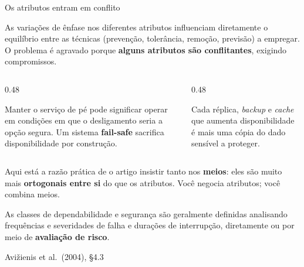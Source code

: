 \documentclass{beamer}
\newcommand{\sect}[1]{\par\smallskip\hfill{\tiny\color{black!55}Avi\v{z}ienis et al.\ (2004), #1}}
\begin{document}
\begin{frame}{Os atributos entram em conflito}
    \footnotesize
    \begin{defi}
        \scriptsize
        As varia\c{c}\~oes de \^enfase nos diferentes atributos influenciam diretamente o equil\'ibrio entre as t\'ecnicas (preven\c{c}\~ao, toler\^ancia, remo\c{c}\~ao, previs\~ao) a empregar. O problema \'e agravado porque \textbf{alguns atributos s\~ao conflitantes}, exigindo compromissos.
    \end{defi}
    \medskip
    \begin{columns}[T]
        \begin{column}{0.48\textwidth}
            \begin{tcolorbox}[colback=depLaranja!8,colframe=depLaranja!70,boxrule=0.6pt,title={\scriptsize\bfseries Disponibilidade x seguran\c{c}a f\'isica}]
                \scriptsize
                Manter o servi\c{c}o de p\'e pode significar operar em condi\c{c}\~oes em que o desligamento seria a op\c{c}\~ao segura. Um sistema \textbf{fail-safe} sacrifica disponibilidade por constru\c{c}\~ao.
            \end{tcolorbox}
        \end{column}
        \begin{column}{0.48\textwidth}
            \begin{tcolorbox}[colback=depLaranja!8,colframe=depLaranja!70,boxrule=0.6pt,title={\scriptsize\bfseries Disponibilidade x confidencialidade}]
                \scriptsize
                Cada r\'eplica, \textit{backup} e \textit{cache} que aumenta disponibilidade \'e mais uma c\'opia do dado sens\'ivel a proteger.
            \end{tcolorbox}
        \end{column}
    \end{columns}
    \medskip
    \begin{ancora}
        \footnotesize
        Aqui est\'a a raz\~ao pr\'atica de o artigo insistir tanto nos \textbf{meios}: eles s\~ao muito mais \textbf{ortogonais entre si} do que os atributos. Voc\^e negocia atributos; voc\^e combina meios.
    \end{ancora}
    \medskip
    {\scriptsize As classes de dependabilidade e seguran\c{c}a s\~ao geralmente definidas analisando frequ\^encias e severidades de falha e dura\c{c}\~oes de interrup\c{c}\~ao, diretamente ou por meio de \textbf{avalia\c{c}\~ao de risco}.}
    \sect{\S4.3}
\end{frame}
\end{document}
